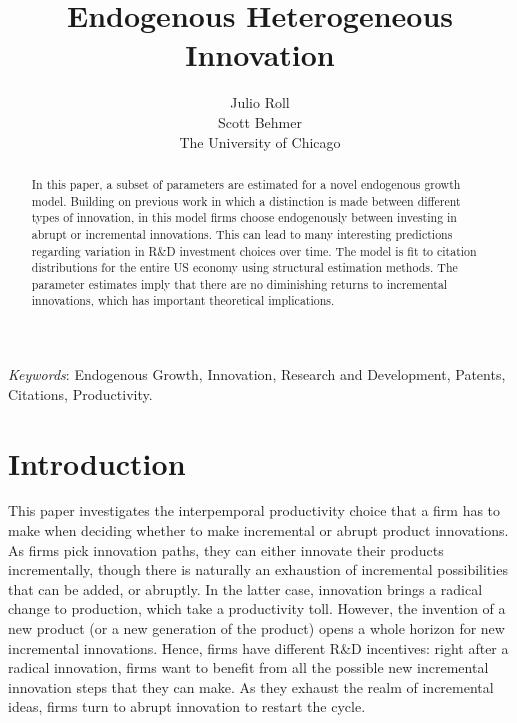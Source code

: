 \documentclass[letterpaper,12pt]{article}
\theoremstyle{definition}
\begin{document}
\title{Endogenous Heterogeneous Innovation}

\author{Julio Roll\\Scott Behmer\\
  The University of Chicago}

\date{}              %


\renewcommand{\thefootnote}{\fnsymbol{footnote}}

\singlespacing

\maketitle

\vspace{-.2in}
\begin{abstract}
\noindent 
In this paper, a subset of parameters are estimated for a novel endogenous growth model. Building on previous work in which a distinction is made between different types of innovation, in this model firms choose endogenously between investing in abrupt or incremental innovations. This can lead to many interesting predictions regarding variation in R\&D investment choices over time. The model is fit to citation distributions for the entire US economy using structural estimation methods. The parameter estimates imply that there are no diminishing returns to incremental innovations, which has important theoretical implications.
\end{abstract}

\medskip
\noindent \textit{Keywords}: Endogenous Growth, Innovation, Research and Development, Patents, Citations, Productivity.

\thispagestyle{empty}

\onehalfspacing
\setcounter{footnote}{1}
\renewcommand{\thefootnote}{\arabic{footnote}}
\setcounter{page}{1}

\section{Introduction}

This paper investigates the interpemporal productivity choice that a firm has to make when deciding whether to make incremental or abrupt product innovations. As firms pick innovation paths, they can either innovate their products incrementally, though there is naturally an exhaustion of incremental possibilities that can be added, or abruptly. In the latter case, innovation brings a radical change to production, which take a productivity toll. However, the invention of a new product (or a new generation of the product) opens a whole horizon for new incremental innovations. Hence, firms have different R\&D incentives: right after a radical innovation, firms want to benefit from all the possible new incremental innovation steps that they can make. As they exhaust the realm of incremental ideas, firms turn to abrupt innovation to restart the cycle.
\end{document}
